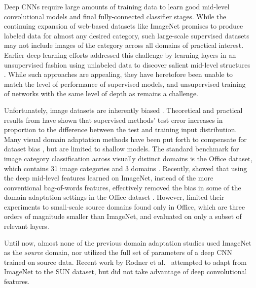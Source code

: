 Deep CNNs require large amounts of training data to learn
good mid-level convolutional models and final fully-connected classifier
stages. While the continuing expansion of web-based datasets like
ImageNet \cite{ilsvrc2012} promises to produce labeled data for almost any desired
category, such large-scale supervised datasets
may not include images of the category across all
domains of practical interest. Earlier deep learning efforts addressed this
challenge by learning layers in an unsupervised fashion using unlabeled data to
discover salient mid-level structures \cite{coates-nips12, dean-nips12}. While such approaches are appealing, they
have heretofore been unable to match the level of performance of supervised
models, and unsupervised training of networks with the same level of depth
as \cite{supervision} remains a challenge.

 
Unfortunately, image datasets are inherently biased \cite{efros-cvpr11}. 
Theoretical \cite{ben2007analysis, blitzer2007learning} and practical results from \cite{saenko-eccv10,efros-cvpr11} have shown that supervised methods' test error increases in proportion to the difference between the test and training input distribution. 
Many visual domain adaptation methods have been put forth to compensate for dataset bias \cite{daume,yang-icdm07,aytar-iccv11,saenko-eccv10,kulis-cvpr11,Khosla-eccv12,gopalan-iccv11,gong-cvpr12,hoffman-eccv12,hoffman-iclr13}, but are limited to shallow models. 
The standard benchmark for image category classification across visually distinct domains is the Office dataset, which contains 31 image categories and 3 domains \cite{saenko-eccv10}. 
Recently, \cite{deeplearning-arxiv-2013} showed that using the deep mid-level features learned on ImageNet, instead of the more conventional bag-of-words features, effectively removed the bias in some of the domain adaptation settings in the Office dataset \cite{saenko-eccv10}.
However, \cite{deeplearning-arxiv-2013} limited their experiments to
small-scale source domains found only in Office, which are three orders of magnitude smaller than ImageNet, and evaluated on only a subset
of relevant layers.

Until now, almost none of the previous domain adaptation studies used ImageNet as the \textit{source} domain, nor utilized the full set of parameters of a deep CNN trained on source data. Recent work by Rodner et al.~\cite{rodner-arxiv13} attempted to adapt from ImageNet to the SUN dataset, but did not take advantage of deep convolutional features. 

